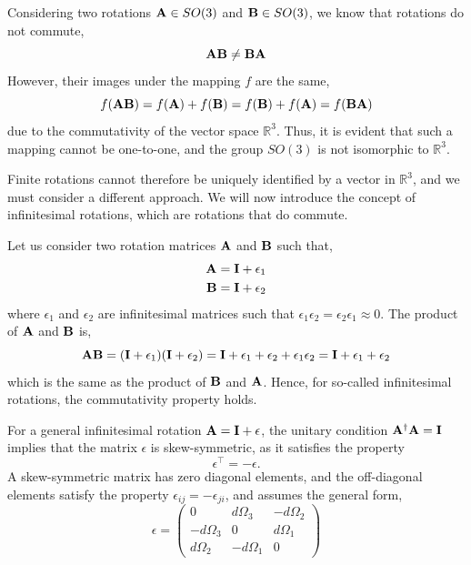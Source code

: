 \documentclass[12pt]{article}
\begin{document}
Considering two rotations $\vb{A} \in SO(3)$ and $\vb{B} \in SO(3)$, we know that rotations
do not commute,
\begin{equation}
  \vb{A}\vb{B} \neq \vb{B}\vb{A}
\end{equation}
However, their images under the mapping $f$ are the same,
\begin{equation}
  f(\vb{A}\vb{B}) = f(\vb{A}) + f(\vb{B}) = f(\vb{B}) + f(\vb{A}) = f(\vb{B}\vb{A})
\end{equation}
due to the commutativity of the vector space $\mathbb{R}^3$. Thus, it is evident that such a
mapping cannot be one-to-one, and the group $SO(3)$ is not isomorphic to $\mathbb{R}^3$.

Finite rotations cannot therefore be uniquely identified by a vector in $\mathbb{R}^3$, and
we must consider a different approach. We will now introduce the concept of infinitesimal
rotations, which are rotations that do commute.

Let us consider two rotation matrices $\vb{A}$ and $\vb{B}$ such that,
\begin{align}
  \vb{A} &= \vb{I} + \epsilon_1 \\
  \vb{B} &= \vb{I} + \epsilon_2
\end{align}
where $\epsilon_1$ and $\epsilon_2$ are infinitesimal matrices such that
$\epsilon_1\epsilon_2 = \epsilon_2\epsilon_1 \approx 0$. The product of $\vb{A}$ and $\vb{B}$
is,
\begin{equation}
  \vb{A}\vb{B} = (\vb{I}+\epsilon_1)(\vb{I}+\epsilon_2) = \vb{I} + \epsilon_1 + \epsilon_2 + \epsilon_1\epsilon_2 = \vb{I} + \epsilon_1 + \epsilon_2
\end{equation}
which is the same as the product of $\vb{B}$ and $\vb{A}$. Hence, for so-called infinitesimal
rotations, the commutativity property holds.

For a general infinitesimal rotation $\vb{A} = \vb{I} + \epsilon$, the unitary condition
$\vb{A}^\dagger\vb{A} = \vb{I}$ implies that the matrix $\epsilon$ is skew-symmetric, as it
satisfies the property
\begin{equation}
  \epsilon^\top = -\epsilon.
\end{equation}
A skew-symmetric matrix has zero diagonal elements, and the off-diagonal elements satisfy the
property $\epsilon_{ij} = -\epsilon_{ji}$, and assumes the general form,
\begin{equation}
  \epsilon =
  \begin{pmatrix}
    0           &  d\Omega_3 & -d\Omega_2 \\
    -d\Omega_3  &  0         &  d\Omega_1 \\
    d\Omega_2   & -d\Omega_1 &  0
  \end{pmatrix}
\end{equation}
\end{document}

